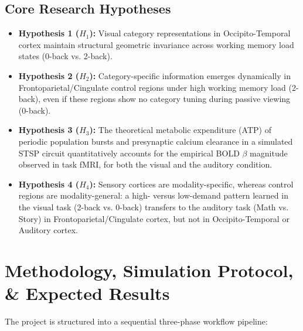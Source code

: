 \documentclass[11pt,a4paper]{article}
\begin{document}
\subsection*{Core Research Hypotheses}

\begin{itemize}
    \item \textbf{Hypothesis 1 ($H_1$):} Visual category representations in Occipito-Temporal cortex maintain structural geometric invariance across working memory load states (0-back vs. 2-back).
    \item \textbf{Hypothesis 2 ($H_2$):} Category-specific information emerges dynamically in Frontoparietal/Cingulate control regions under high working memory load (2-back), even if these regions show no category tuning during passive viewing (0-back).
    \item \textbf{Hypothesis 3 ($H_3$):} The theoretical metabolic expenditure (ATP) of periodic population bursts and presynaptic calcium clearance in a simulated STSP circuit quantitatively accounts for the empirical BOLD $\beta$ magnitude observed in task fMRI, for both the visual and the auditory condition.
    \item \textbf{Hypothesis 4 ($H_4$):} Sensory cortices are modality-specific, whereas control regions are modality-general: a high- versus low-demand pattern learned in the visual task (2-back vs. 0-back) transfers to the auditory task (Math vs. Story) in Frontoparietal/Cingulate cortex, but not in Occipito-Temporal or Auditory cortex.
\end{itemize}

\section{Methodology, Simulation Protocol, \& Expected Results}

The project is structured into a sequential three-phase workflow pipeline:

\begin{center}
\end{center}
\end{document}
